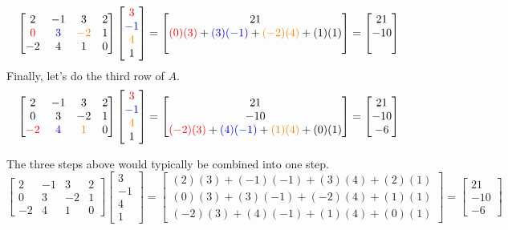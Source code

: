 \documentclass{ximera}
\begin{document}
\begin{example}
\begin{explanation}
$$\begin{bmatrix}2&-1&3&2\\{\color{red}0}&{\color{blue}3}&{\color{orange}-2}&1\\-2&4&1&0\end{bmatrix}\begin{bmatrix}{\color{red}3}\\{\color{blue}-1}\\{\color{orange}4}\\1\end{bmatrix}=\begin{bmatrix}21\\{\color{red}(0)( 3)}+{\color{blue}(3)(-1)}+{\color{orange}(-2)(4)}+(1)(1)\\ \\ \end{bmatrix}=\begin{bmatrix}21\\-10 \\ \\\end{bmatrix}
$$
Finally, let's do the third row of $A$.
$$\begin{bmatrix}2&-1&3&2\\0&3&-2&1\\{\color{red}-2}&{\color{blue}4}&{\color{orange}1}&0\end{bmatrix}\begin{bmatrix}{\color{red}3}\\{\color{blue}-1}\\{\color{orange}4}\\1\end{bmatrix}=\begin{bmatrix}21\\-10\\{\color{red}(-2)( 3)}+{\color{blue}(4)(-1)}+{\color{orange}(1)(4)}+(0)(1) \end{bmatrix}=\begin{bmatrix}21\\-10 \\ -6\end{bmatrix}
$$

The three steps above would typically be combined into one step.
$$\begin{bmatrix}2&-1&3&2\\0&3&-2&1\\-2&4&1&0\end{bmatrix}\begin{bmatrix}3\\-1\\4\\1\end{bmatrix}=\begin{bmatrix}(2)(3)+(-1)(-1)+(3)(4)+(2)(1)\\(0)(3)+(3)(-1)+(-2)(4)+(1)(1)\\(-2)( 3)+(4)(-1)+(1)(4)+(0)(1) \end{bmatrix}=\begin{bmatrix}21\\-10 \\ -6\end{bmatrix}
$$


\end{explanation}
\end{example}
\end{document}
